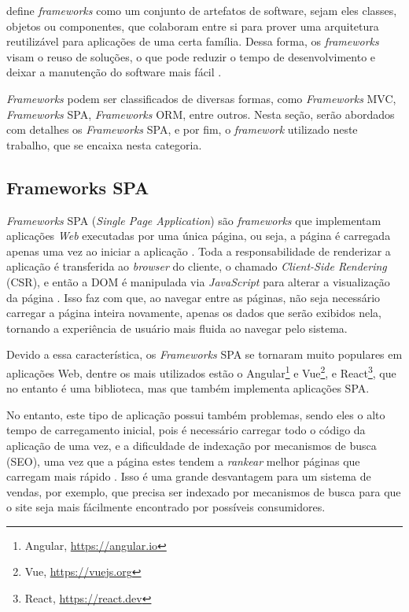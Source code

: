  define \textit{frameworks} como um conjunto de artefatos de software, sejam eles
classes, objetos ou componentes, que colaboram entre si para prover uma arquitetura reutilizável
para aplicações de uma certa família. Dessa forma, os \textit{frameworks} visam o reuso de soluções, o que
pode reduzir o tempo de desenvolvimento e deixar a manutenção do software mais fácil \cite{gamma:2000}.

\textit{Frameworks} podem ser classificados de diversas formas, como \textit{Frameworks} MVC,
\textit{Frameworks} SPA, \textit{Frameworks} ORM, entre outros. Nesta seção, serão abordados
com detalhes os \textit{Frameworks} SPA, e por fim, o \textit{framework} utilizado neste trabalho,
que se encaixa nesta categoria.

\subsection{Frameworks SPA}
\label{sec-fundteo-framework-spa}

\textit{Frameworks} SPA (\textit{Single Page Application}) são \textit{frameworks} que implementam
aplicações \textit{Web} executadas por uma única página, ou seja, a página é carregada apenas uma vez 
ao iniciar a aplicação \cite{emmitt:2015}. Toda a responsabilidade de renderizar a aplicação é
transferida ao \textit{browser} do cliente, o chamado \textit{Client-Side Rendering} (CSR),
e então a DOM é manipulada via \textit{JavaScript} para alterar a visualização da 
página \cite{emmitt:2015,konshin:2018}. Isso faz com que, ao navegar entre as páginas, não 
seja necessário carregar a página inteira novamente, apenas os dados que serão exibidos nela, 
tornando a experiência de usuário mais fluida ao navegar pelo sistema. 

Devido a essa característica, os \textit{Frameworks} SPA se tornaram muito populares em aplicações
Web, dentre os mais utilizados estão o Angular\footnote{Angular, \url{https://angular.io}}
e Vue\footnote{Vue, \url{https://vuejs.org}}, e React\footnote{React, \url{https://react.dev}}, 
que no entanto é uma biblioteca, mas que também implementa aplicações SPA.

No entanto, este tipo de aplicação possui também problemas, sendo eles o alto tempo de carregamento
inicial, pois é necessário carregar todo o código da aplicação de uma vez, e a dificuldade de
indexação por mecanismos de busca (SEO), uma vez que a página estes tendem a \textit{rankear} melhor
páginas que carregam mais rápido \cite{konshin:2018}. Isso é uma grande desvantagem para um sistema
de vendas, por exemplo, que precisa ser indexado por mecanismos de busca para que o site seja mais
fácilmente encontrado por possíveis consumidores.


